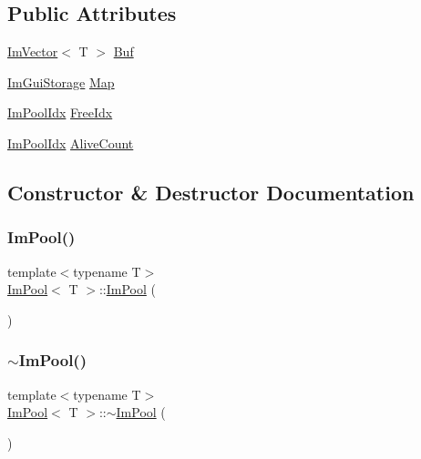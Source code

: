 \subsection*{Public Attributes}
\begin{DoxyCompactItemize}
\item 
\hyperlink{structImVector}{Im\+Vector}$<$ T $>$ \hyperlink{structImPool_ab9368393a8b95f903d77bd49beb84a18}{Buf}
\item 
\hyperlink{structImGuiStorage}{Im\+Gui\+Storage} \hyperlink{structImPool_a6d3b4c9267ef5f496abb97871f9820eb}{Map}
\item 
\hyperlink{imgui__internal_8h_a2bcd38f7be434db57a9757ebf7aa56d0}{Im\+Pool\+Idx} \hyperlink{structImPool_afe057c62cef34c6425dd56a8a396c118}{Free\+Idx}
\item 
\hyperlink{imgui__internal_8h_a2bcd38f7be434db57a9757ebf7aa56d0}{Im\+Pool\+Idx} \hyperlink{structImPool_aa4a1075102fbc90875cc6144b3961e49}{Alive\+Count}
\end{DoxyCompactItemize}


\subsection{Constructor \& Destructor Documentation}
\mbox{\label{structImPool_a8377750adcef3c1b858b6271bc6ecff8}} 
\subsubsection{\texorpdfstring{Im\+Pool()}{ImPool()}}
{\footnotesize\ttfamily template$<$typename T$>$ \\
\hyperlink{structImPool}{Im\+Pool}$<$ T $>$\+::\hyperlink{structImPool}{Im\+Pool} (\begin{DoxyParamCaption}{ }\end{DoxyParamCaption})\hspace{0.3cm}{\ttfamily [inline]}}

\mbox{\label{structImPool_aa0b55e4483e95d6723d51b5106de4bc2}} 
\subsubsection{\texorpdfstring{$\sim$\+Im\+Pool()}{~ImPool()}}
{\footnotesize\ttfamily template$<$typename T$>$ \\
\hyperlink{structImPool}{Im\+Pool}$<$ T $>$\+::$\sim$\hyperlink{structImPool}{Im\+Pool} (\begin{DoxyParamCaption}{ }\end{DoxyParamCaption})\hspace{0.3cm}{\ttfamily [inline]}}



